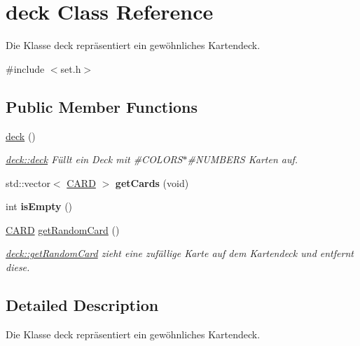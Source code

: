 \hypertarget{classdeck}{\section{deck Class Reference}
\label{classdeck}
}


Die Klasse deck repräsentiert ein gewöhnliches Kartendeck.  




{\ttfamily \#include $<$set.\-h$>$}

\subsection*{Public Member Functions}
\begin{DoxyCompactItemize}
\item 
\hypertarget{classdeck_a2ff8465ba7b13201bdf650fe461b442e}{\hyperlink{classdeck_a2ff8465ba7b13201bdf650fe461b442e}{deck} ()}\label{classdeck_a2ff8465ba7b13201bdf650fe461b442e}

\begin{DoxyCompactList}\small\item\em \hyperlink{classdeck_a2ff8465ba7b13201bdf650fe461b442e}{deck\-::deck} Füllt ein Deck mit \#\-C\-O\-L\-O\-R\-S$\ast$\#\-N\-U\-M\-B\-E\-R\-S Karten auf. \end{DoxyCompactList}\item 
\hypertarget{classdeck_a26cfcf4196728cde8b904dbcf63bc815}{std\-::vector$<$ \hyperlink{struct_c_a_r_d}{C\-A\-R\-D} $>$ {\bfseries get\-Cards} (void)}\label{classdeck_a26cfcf4196728cde8b904dbcf63bc815}

\item 
\hypertarget{classdeck_a3a190c2877d3822b7379d6a9fa2c050b}{int {\bfseries is\-Empty} ()}\label{classdeck_a3a190c2877d3822b7379d6a9fa2c050b}

\item 
\hyperlink{struct_c_a_r_d}{C\-A\-R\-D} \hyperlink{classdeck_a8e33dbdafe69c55d968526d9543245ec}{get\-Random\-Card} ()
\begin{DoxyCompactList}\small\item\em \hyperlink{classdeck_a8e33dbdafe69c55d968526d9543245ec}{deck\-::get\-Random\-Card} zieht eine zufällige Karte auf dem Kartendeck und entfernt diese. \end{DoxyCompactList}\end{DoxyCompactItemize}


\subsection{Detailed Description}
Die Klasse deck repräsentiert ein gewöhnliches Kartendeck. 

